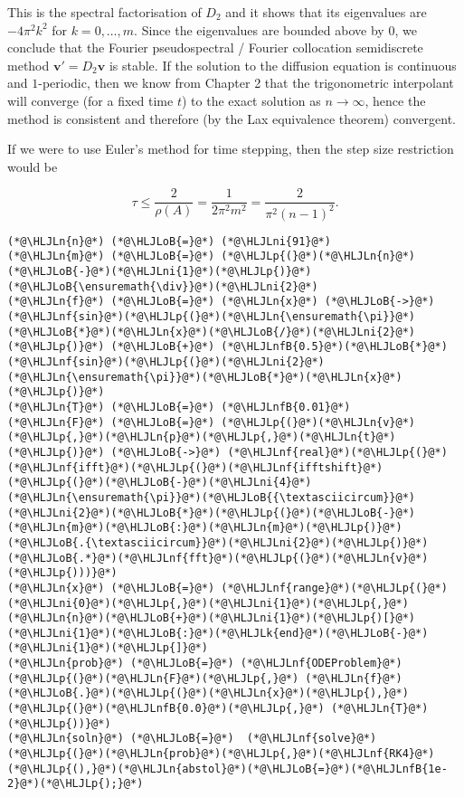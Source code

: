 \documentclass[12pt,landscape]{article}
\newcommand{\HLJLk}[1]{\textcolor[RGB]{148,91,176}{\textbf{#1}}}
\newcommand{\HLJLn}[1]{#1}
\newcommand{\HLJLnf}[1]{\textcolor[RGB]{66,102,213}{#1}}
\newcommand{\HLJLnfB}[1]{\textcolor[RGB]{59,151,46}{#1}}
\newcommand{\HLJLni}[1]{\textcolor[RGB]{59,151,46}{#1}}
\newcommand{\HLJLoB}[1]{\textcolor[RGB]{102,102,102}{\textbf{#1}}}
\newcommand{\HLJLp}[1]{#1}
\begin{document}
{This is the spectral factorisation of $D_2$ and it shows that its eigenvalues are $-4\pi^2k^2$ for $k = 0, \ldots, m$.  Since the eigenvalues are bounded above by $0$, we conclude that the Fourier pseudospectral / Fourier collocation semidiscrete method $\mathbf{v}' = D_2\mathbf{v}$ is stable.  If the solution to the diffusion equation is continuous and $1$-periodic, then we know from Chapter 2 that the trigonometric interpolant will converge (for a fixed time $t$) to the exact solution as $n \to \infty$, hence the method is consistent and therefore (by the Lax equivalence theorem) convergent.

If we were to use Euler's method for time stepping, then the step size restriction would be

\[
\tau \leq \frac{2}{\rho(A)} = \frac{1}{2\pi^2 m^2} = \frac{2}{\pi^2 (n-1)^2}.
\]

\begin{lstlisting}
(*@\HLJLn{n}@*) (*@\HLJLoB{=}@*) (*@\HLJLni{91}@*)
(*@\HLJLn{m}@*) (*@\HLJLoB{=}@*) (*@\HLJLp{(}@*)(*@\HLJLn{n}@*)(*@\HLJLoB{-}@*)(*@\HLJLni{1}@*)(*@\HLJLp{)}@*)(*@\HLJLoB{\ensuremath{\div}}@*)(*@\HLJLni{2}@*)
(*@\HLJLn{f}@*) (*@\HLJLoB{=}@*) (*@\HLJLn{x}@*) (*@\HLJLoB{->}@*) (*@\HLJLnf{sin}@*)(*@\HLJLp{(}@*)(*@\HLJLn{\ensuremath{\pi}}@*)(*@\HLJLoB{*}@*)(*@\HLJLn{x}@*)(*@\HLJLoB{/}@*)(*@\HLJLni{2}@*)(*@\HLJLp{)}@*) (*@\HLJLoB{+}@*) (*@\HLJLnfB{0.5}@*)(*@\HLJLoB{*}@*)(*@\HLJLnf{sin}@*)(*@\HLJLp{(}@*)(*@\HLJLni{2}@*)(*@\HLJLn{\ensuremath{\pi}}@*)(*@\HLJLoB{*}@*)(*@\HLJLn{x}@*)(*@\HLJLp{)}@*)
(*@\HLJLn{T}@*) (*@\HLJLoB{=}@*) (*@\HLJLnfB{0.01}@*)
(*@\HLJLn{F}@*) (*@\HLJLoB{=}@*) (*@\HLJLp{(}@*)(*@\HLJLn{v}@*)(*@\HLJLp{,}@*)(*@\HLJLn{p}@*)(*@\HLJLp{,}@*)(*@\HLJLn{t}@*)(*@\HLJLp{)}@*) (*@\HLJLoB{->}@*) (*@\HLJLnf{real}@*)(*@\HLJLp{(}@*)(*@\HLJLnf{ifft}@*)(*@\HLJLp{(}@*)(*@\HLJLnf{ifftshift}@*)(*@\HLJLp{(}@*)(*@\HLJLoB{-}@*)(*@\HLJLni{4}@*)(*@\HLJLn{\ensuremath{\pi}}@*)(*@\HLJLoB{{\textasciicircum}}@*)(*@\HLJLni{2}@*)(*@\HLJLoB{*}@*)(*@\HLJLp{(}@*)(*@\HLJLoB{-}@*)(*@\HLJLn{m}@*)(*@\HLJLoB{:}@*)(*@\HLJLn{m}@*)(*@\HLJLp{)}@*)(*@\HLJLoB{.{\textasciicircum}}@*)(*@\HLJLni{2}@*)(*@\HLJLp{)}@*) (*@\HLJLoB{.*}@*)(*@\HLJLnf{fft}@*)(*@\HLJLp{(}@*)(*@\HLJLn{v}@*)(*@\HLJLp{)))}@*)
(*@\HLJLn{x}@*) (*@\HLJLoB{=}@*) (*@\HLJLnf{range}@*)(*@\HLJLp{(}@*)(*@\HLJLni{0}@*)(*@\HLJLp{,}@*)(*@\HLJLni{1}@*)(*@\HLJLp{,}@*)(*@\HLJLn{n}@*)(*@\HLJLoB{+}@*)(*@\HLJLni{1}@*)(*@\HLJLp{)[}@*)(*@\HLJLni{1}@*)(*@\HLJLoB{:}@*)(*@\HLJLk{end}@*)(*@\HLJLoB{-}@*)(*@\HLJLni{1}@*)(*@\HLJLp{]}@*)
(*@\HLJLn{prob}@*) (*@\HLJLoB{=}@*) (*@\HLJLnf{ODEProblem}@*)(*@\HLJLp{(}@*)(*@\HLJLn{F}@*)(*@\HLJLp{,}@*) (*@\HLJLn{f}@*)(*@\HLJLoB{.}@*)(*@\HLJLp{(}@*)(*@\HLJLn{x}@*)(*@\HLJLp{),}@*) (*@\HLJLp{(}@*)(*@\HLJLnfB{0.0}@*)(*@\HLJLp{,}@*) (*@\HLJLn{T}@*)(*@\HLJLp{))}@*)
(*@\HLJLn{soln}@*) (*@\HLJLoB{=}@*)  (*@\HLJLnf{solve}@*)(*@\HLJLp{(}@*)(*@\HLJLn{prob}@*)(*@\HLJLp{,}@*)(*@\HLJLnf{RK4}@*)(*@\HLJLp{(),}@*)(*@\HLJLn{abstol}@*)(*@\HLJLoB{=}@*)(*@\HLJLnfB{1e-2}@*)(*@\HLJLp{);}@*)
\end{lstlisting}


}
\end{document}
